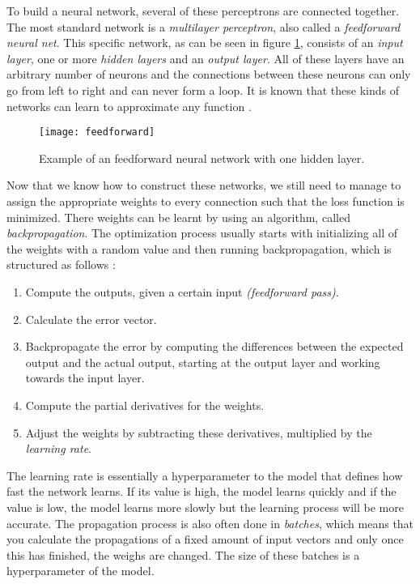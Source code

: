 To build a neural network, several of these perceptrons are connected together.
The most standard network is a \textit{multilayer perceptron}, also called a \textit{feedforward neural net}.
This specific network, as can be seen in figure \ref{fig:feedforward}, consists of an \textit{input layer}, one or more \textit{hidden layers} and an \textit{output layer}.
All of these layers have an arbitrary number of neurons and the connections between these neurons can only go from left to right and can never form a loop.
It is known that these kinds of networks can learn to approximate any function \cite{valiant2014learning}.

\begin{figure}[ht]
  \centering
  \texttt{[image: feedforward]}
  \caption{Example of an feedforward neural network with one hidden layer.}
  \label{fig:feedforward}
\end{figure}

Now that we know how to construct these networks, we still need to manage to assign the appropriate weights to every connection such that the loss function is minimized.
There weights can be learnt by using an algorithm, called \textit{backpropagation}.
The optimization process usually starts with initializing all of the weights with a random value and then running backpropagation, which is structured as follows \cite{nielsen_2017}:

\newpage

\begin{enumerate}
  \item Compute the outputs, given a certain input \textit{(feedforward pass)}.
  \item Calculate the error vector.
  \item Backpropagate the error by computing the differences between the expected output and the actual output, starting at the output layer and working towards the input layer.
  \item Compute the partial derivatives for the weights.
  \item Adjust the weights by subtracting these derivatives, multiplied by the \textit{learning rate}.
\end{enumerate}

The learning rate is essentially a hyperparameter to the model that defines how fast the network learns.
If its value is high, the model learns quickly and if the value is low, the model learns more slowly but the learning process will be more accurate.
The propagation process is also often done in \textit{batches}, which means that you calculate the propagations of a fixed amount of input vectors and only once this has finished, the weighs are changed.
The size of these batches is a hyperparameter of the model.

